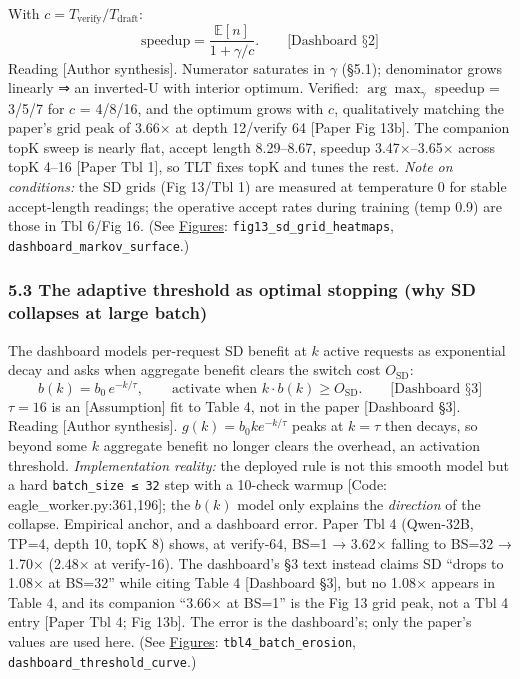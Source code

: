 \documentclass[
  11pt,
  letterpaper,
]{article}
\begin{document}
With \(c=T_{\text{verify}}/T_{\text{draft}}\):
\[\text{speedup}=\frac{\mathbb{E}[n]}{1+\gamma/c}.\qquad\text{[Dashboard §2]}\]
Reading {[}Author synthesis{]}. Numerator saturates in \(\gamma\)
(§5.1); denominator grows linearly ⇒ an inverted-U with interior
optimum. Verified: \(\arg\max_\gamma\) speedup = 3/5/7 for \(c\) =
4/8/16, and the optimum grows with \(c\), qualitatively matching the
paper's grid peak of 3.66× at depth 12/verify 64 {[}Paper Fig 13b{]}.
The companion topK sweep is nearly flat, accept length 8.29--8.67,
speedup 3.47×--3.65× across topK 4--16 {[}Paper Tbl 1{]}, so TLT fixes
topK and tunes the rest. \emph{Note on conditions:} the SD grids (Fig
13/Tbl 1) are measured at temperature 0 for stable accept-length
readings; the operative accept rates during training (temp 0.9) are
those in Tbl 6/Fig 16. (See \hyperref[figures]{Figures}:
\texttt{fig13\_sd\_grid\_heatmaps},
\texttt{dashboard\_markov\_surface}.)

\subsubsection{5.3 The adaptive threshold as optimal stopping (why SD
collapses at large
batch)}\label{the-adaptive-threshold-as-optimal-stopping-why-sd-collapses-at-large-batch}

The dashboard models per-request SD benefit at \(k\) active requests as
exponential decay and asks when aggregate benefit clears the switch cost
\(O_{\text{SD}}\):
\[b(k)=b_0\,e^{-k/\tau},\qquad\text{activate when } k\cdot b(k)\ge O_{\text{SD}}.\qquad\text{[Dashboard §3]}\]
\(\tau=16\) is an {[}Assumption{]} fit to Table 4, not in the paper
{[}Dashboard §3{]}. Reading {[}Author synthesis{]}.
\(g(k)=b_0 k e^{-k/\tau}\) peaks at \(k=\tau\) then decays, so beyond
some \(k\) aggregate benefit no longer clears the overhead, an
activation threshold. \emph{Implementation reality:} the deployed rule
is not this smooth model but a hard \texttt{batch\_size\ ≤\ 32} step
with a 10-check warmup {[}Code: eagle\_worker.py:361,196{]}; the
\(b(k)\) model only explains the \emph{direction} of the collapse.
Empirical anchor, and a dashboard error. Paper Tbl 4 (Qwen-32B, TP=4,
depth 10, topK 8) shows, at verify-64, BS=1 → 3.62× falling to BS=32 →
1.70× (2.48× at verify-16). The dashboard's §3 text instead claims SD
``drops to 1.08× at BS=32'' while citing Table 4 {[}Dashboard §3{]}, but
no 1.08× appears in Table 4, and its companion ``3.66× at BS=1'' is the
Fig 13 grid peak, not a Tbl 4 entry {[}Paper Tbl 4; Fig 13b{]}. The
error is the dashboard's; only the paper's values are used here. (See
\hyperref[figures]{Figures}: \texttt{tbl4\_batch\_erosion},
\texttt{dashboard\_threshold\_curve}.)
\end{document}
